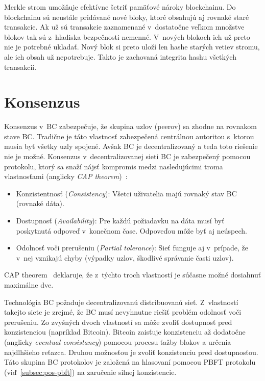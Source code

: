 Merkle strom umožňuje efektívne šetriť pamäťové nároky blockchainu. Do blockchainu sú neustále pridávané nové bloky, ktoré obsahujú aj rovnaké staré transakcie. Ak už sú transakcie zaznamenané v~dostatočne veľkom množstve blokov tak sú z~hľadiska bezpečnosti nemenné. V~nových blokoch ich už preto nie je potrebné ukladať. Nový blok si preto uloží len hashe starých vetiev stromu, ale ich obsah už nepotrebuje. Takto je zachovaná integrita hashu všetkých transakcií.~\cite{satoshiBitcoin}


\chapter{Konsenzus}\label{chap:consenzus}

Konsenzus v~BC zabezpečuje, že skupina uzlov (peerov) sa  zhodne na rovnakom stave BC. Tradične je táto vlastnosť zabezpečená centrálnou autoritou s~ktorou musia byť všetky uzly spojené. Avšak BC je decentralizovaný a teda toto riešenie nie je možné. Konsenzus v~decentralizovanej sieti BC je zabezpečený pomocou protokolu, ktorý sa snaží nájsť kompromis medzi nasledujúcimi troma vlastnosťami (anglicky \textit{CAP theorem})~\cite{gilbertCAP, zhangConsensus, leporeConsensus}:
\begin{itemize}
	\item Konzistentnosť (\textit{Consistency}): Všetci uživatelia majú rovnaký stav BC (rovnaké dáta).
	\item Dostupnosť (\textit{Availability}): Pre každú požiadavku na dáta musí byť poskytnutá odpoveď v~konečnom čase. Odpoveďou môže byť aj neúspech.
	\item Odolnosť voči prerušeniu (\textit{Partial tolerance}): Sieť funguje aj v~prípade, že v~nej vznikajú chyby (výpadky uzlov, škodlivé správanie časti uzlov).
\end{itemize}
CAP theorem~\cite{gilbertCAP} deklaruje, že z~týchto troch vlastností je súčasne možné dosiahnuť maximálne dve.

Technológia BC požaduje decentralizovanú distribuovanú sieť. Z~vlastností takejto siete je zrejmé, že BC musí nevyhnutne riešiť problém odolnosť voči prerušeniu. Zo zvyšných dvoch vlastností sa môže zvoliť dostupnosť pred konzistenciou (napríklad Bitcoin). Bitcoin zaisťuje konzistenciu až dodatočne (anglicky \textit{eventual consistancy}) pomocou procesu ťažby blokov a určenia najdlhšieho reťazca. Druhou možnosťou je zvoliť konzistenciu pred dostupnosťou. Táto skupina BC protokolov je založená na hlasovaní pomocou PBFT protokolu (viď~\ref{subsec:pos-pbft}) na zaručenie silnej konzistencie.~\cite{capViswanath}

